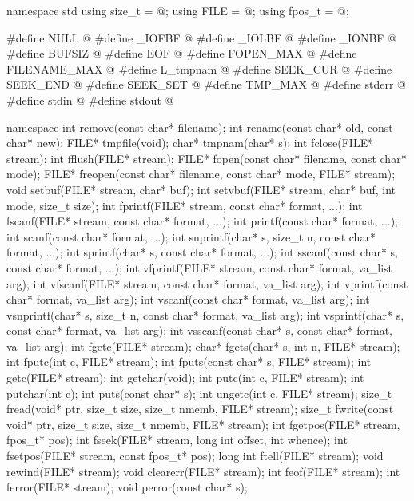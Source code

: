 \begin{codeblock}
namespace std {
  using size_t = @\seebelow@;
  using FILE = @\seebelow@;
  using fpos_t = @\seebelow@;
}

#define NULL @\seebelow@
#define _IOFBF @\seebelow@
#define _IOLBF @\seebelow@
#define _IONBF @\seebelow@
#define BUFSIZ @\seebelow@
#define EOF @\seebelow@
#define FOPEN_MAX @\seebelow@
#define FILENAME_MAX @\seebelow@
#define L_tmpnam @\seebelow@
#define SEEK_CUR @\seebelow@
#define SEEK_END @\seebelow@
#define SEEK_SET @\seebelow@
#define TMP_MAX @\seebelow@
#define stderr @\seebelow@
#define stdin @\seebelow@
#define stdout @\seebelow@

namespace {
  int remove(const char* filename);
  int rename(const char* old, const char* new);
  FILE* tmpfile(void);
  char* tmpnam(char* s);
  int fclose(FILE* stream);
  int fflush(FILE* stream);
  FILE* fopen(const char* filename, const char* mode);
  FILE* freopen(const char* filename, const char* mode, FILE* stream);
  void setbuf(FILE* stream, char* buf);
  int setvbuf(FILE* stream, char* buf, int mode, size_t size);
  int fprintf(FILE* stream, const char* format, ...);
  int fscanf(FILE* stream, const char* format, ...);
  int printf(const char* format, ...);
  int scanf(const char* format, ...);
  int snprintf(char* s, size_t n, const char* format, ...);
  int sprintf(char* s, const char* format, ...);
  int sscanf(const char* s, const char* format, ...);
  int vfprintf(FILE* stream, const char* format, va_list arg);
  int vfscanf(FILE* stream, const char* format, va_list arg);
  int vprintf(const char* format, va_list arg);
  int vscanf(const char* format, va_list arg);
  int vsnprintf(char* s, size_t n, const char* format, va_list arg);
  int vsprintf(char* s, const char* format, va_list arg);
  int vsscanf(const char* s, const char* format, va_list arg);
  int fgetc(FILE* stream);
  char* fgets(char* s, int n, FILE* stream);
  int fputc(int c, FILE* stream);
  int fputs(const char* s, FILE* stream);
  int getc(FILE* stream);
  int getchar(void);
  int putc(int c, FILE* stream);
  int putchar(int c);
  int puts(const char* s);
  int ungetc(int c, FILE* stream);
  size_t fread(void* ptr, size_t size, size_t nmemb, FILE* stream);
  size_t fwrite(const void* ptr, size_t size, size_t nmemb, FILE* stream);
  int fgetpos(FILE* stream, fpos_t* pos);
  int fseek(FILE* stream, long int offset, int whence);
  int fsetpos(FILE* stream, const fpos_t* pos);
  long int ftell(FILE* stream);
  void rewind(FILE* stream);
  void clearerr(FILE* stream);
  int feof(FILE* stream);
  int ferror(FILE* stream);
  void perror(const char* s);
}
\end{codeblock}

